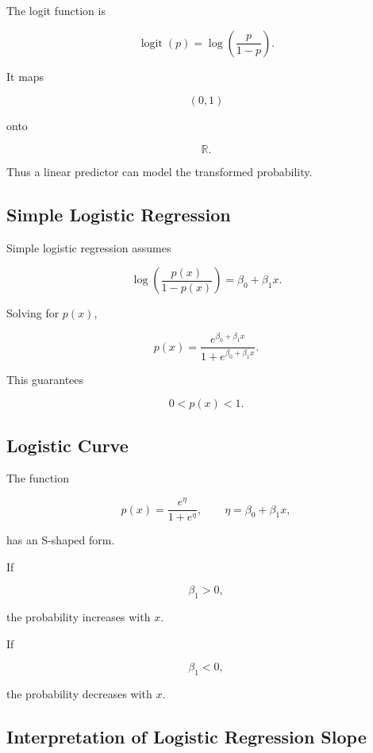 The logit function is

\[
\boxed{
\operatorname{logit}(p)
=
\log
\left(
\frac{
p
}{
1-p
}
\right).
}
\]

It maps

\[
(0,1)
\]

onto

\[
\mathbb{R}.
\]

Thus a linear predictor can model the transformed probability.

\subsection{Simple Logistic Regression}
\label{subsec:simple-logistic-regression}

Simple logistic regression assumes

\[
\boxed{
\log
\left(
\frac{
p(x)
}{
1-p(x)
}
\right)
=
\beta_0+\beta_1x.
}
\]

Solving for \(p(x)\),

\[
\boxed{
p(x)
=
\frac{
e^{\beta_0+\beta_1x}
}{
1+
e^{\beta_0+\beta_1x}
}.
}
\]

This guarantees

\[
0<p(x)<1.
\]

\subsection{Logistic Curve}
\label{subsec:logistic-curve}

The function

\[
p(x)
=
\frac{
e^{\eta}
}{
1+e^{\eta}
},
\qquad
\eta=\beta_0+\beta_1x,
\]

has an S-shaped form.

If

\[
\beta_1>0,
\]

the probability increases with \(x\).

If

\[
\beta_1<0,
\]

the probability decreases with \(x\).

\subsection{Interpretation of Logistic Regression Slope}
\label{subsec:logistic-slope-interpretation}

